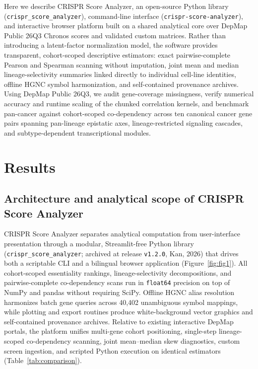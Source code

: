 \documentclass[11pt,a4paper]{article}
\begin{document}
Here we describe CRISPR Score Analyzer, an open-source Python library (\texttt{crispr\_score\_analyzer}), command-line interface (\texttt{crispr-score-analyzer}), and interactive browser platform built on a shared analytical core over DepMap Public 26Q3 Chronos scores and validated custom matrices. Rather than introducing a latent-factor normalization model, the software provides transparent, cohort-scoped descriptive estimators: exact pairwise-complete Pearson and Spearman scanning without imputation, joint mean and median lineage-selectivity summaries linked directly to individual cell-line identities, offline HGNC symbol harmonization, and self-contained provenance archives. Using DepMap Public 26Q3, we audit gene-coverage missingness, verify numerical accuracy and runtime scaling of the chunked correlation kernels, and benchmark pan-cancer against cohort-scoped co-dependency across ten canonical cancer gene pairs spanning pan-lineage epistatic axes, lineage-restricted signaling cascades, and subtype-dependent transcriptional modules.

\section{Results}

\subsection{Architecture and analytical scope of CRISPR Score Analyzer}
CRISPR Score Analyzer separates analytical computation from user-interface presentation through a modular, Streamlit-free Python library (\texttt{crispr\_score\_analyzer}; archived at release \texttt{v1.2.0}, Kan, 2026) that drives both a scriptable CLI and a bilingual browser application (Figure~\ref{fig:fig1}). All cohort-scoped essentiality rankings, lineage-selectivity decompositions, and pairwise-complete co-dependency scans run in \texttt{float64} precision on top of NumPy and pandas without requiring SciPy. Offline HGNC alias resolution harmonizes batch gene queries across 40,402 unambiguous symbol mappings, while plotting and export routines produce white-background vector graphics and self-contained provenance archives. Relative to existing interactive DepMap portals, the platform unifies multi-gene cohort positioning, single-step lineage-scoped co-dependency scanning, joint mean--median skew diagnostics, custom screen ingestion, and scripted Python execution on identical estimators (Table~\ref{tab:comparison}).
\end{document}
